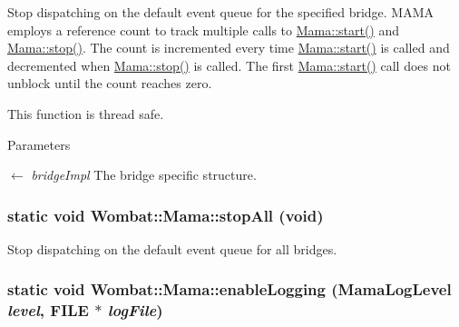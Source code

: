 Stop dispatching on the default event queue for the specified bridge. MAMA employs a reference count to track multiple calls to \hyperlink{classWombat_1_1Mama_a826ec494ed4cd1f9b8ac1baa8ca5af30}{Mama::start()} and \hyperlink{classWombat_1_1Mama_a88d25e14a503f35d86173bfaee50922e}{Mama::stop()}. The count is incremented every time \hyperlink{classWombat_1_1Mama_a826ec494ed4cd1f9b8ac1baa8ca5af30}{Mama::start()} is called and decremented when \hyperlink{classWombat_1_1Mama_a88d25e14a503f35d86173bfaee50922e}{Mama::stop()} is called. The first \hyperlink{classWombat_1_1Mama_a826ec494ed4cd1f9b8ac1baa8ca5af30}{Mama::start()} call does not unblock until the count reaches zero.

This function is thread safe.


\begin{DoxyParams}{Parameters}
\item[\mbox{$\leftarrow$} {\em bridgeImpl}]The bridge specific structure. \end{DoxyParams}
\hypertarget{classWombat_1_1Mama_a5e5eeaecf4309a709e8448dfcbbc5d89}{
\subsubsection[{stopAll}]{\setlength{\rightskip}{0pt plus 5cm}static void Wombat::Mama::stopAll (void)}}
\label{classWombat_1_1Mama_a5e5eeaecf4309a709e8448dfcbbc5d89}


Stop dispatching on the default event queue for all bridges. \hypertarget{classWombat_1_1Mama_a4b73e9c99a4e170c8d2ed378746c5f72}{
\subsubsection[{enableLogging}]{\setlength{\rightskip}{0pt plus 5cm}static void Wombat::Mama::enableLogging (MamaLogLevel {\em level}, \/  FILE $\ast$ {\em logFile})}}
\label{classWombat_1_1Mama_a4b73e9c99a4e170c8d2ed378746c5f72}


